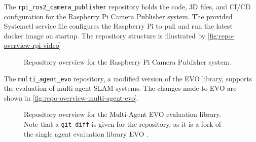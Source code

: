 The \texttt{rpi\_ros2\_camera\_publisher} repository holds the code, 3D files, and CI/CD configuration for the Raspberry Pi Camera Publisher system. The provided Systemctl service file configures the Raspberry Pi to pull and run the latest docker image on startup. The repository structure is illustrated by \autoref{fig:repo-overview-rpi-video}

\begin{figure}[h]
    \centering
    \captionsetup{justification=raggedright,singlelinecheck=false, skip=0.5em}
    \begin{minipage}[t]{0.925\linewidth}
        \footnotesize
        \setlength{\DTbaselineskip}{12pt}
    \end{minipage}
    \caption{Repository overview for the Raspberry Pi Camera Publisher system.}
    \label{fig:repo-overview-rpi-video}
\end{figure}

The \texttt{multi\_agent\_evo} repository, a modified version of the EVO library, supports the evaluation of multi-agent SLAM systems. The changes made to EVO are shown in \autoref{fig:repo-overview-multi-agent-evo}.

\begin{figure}[h]
    \centering
    \captionsetup{skip=0.5em}
    \begin{minipage}[t]{0.925\linewidth}
        \footnotesize
        \setlength{\DTbaselineskip}{12pt}
    \end{minipage}
    \caption{Repository overview for the Multi-Agent EVO evaluation library. \captionbreak Note that a \texttt{git diff} is given for the repository, as it is a fork of the single agent evaluation library EVO \autocite{grupp2017evo}.}
    \label{fig:repo-overview-multi-agent-evo}
\end{figure}

